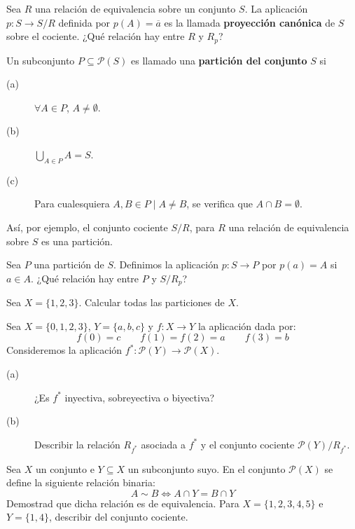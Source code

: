 \begin{ejercicio}
    Sea $R$ una relación de equivalencia sobre un conjunto $S$. La aplicación $p:S\to S/R$ definida por $p(A) = \overline{a}$ es la llamada \textbf{proyección canónica} de $S$ sobre el cociente. ¿Qué relación hay entre $R$ y $R_p$?
\end{ejercicio}

\begin{ejercicio}
    Un subconjunto $P\subseteq \mathcal{P}(S)$ es llamado una \textbf{partición del conjunto} $S$ si
    \begin{description}
        \item [(a)] $\forall A\in P$, $A\neq \emptyset $.
        \item [(b)] $\bigcup_{A\in P}A=S$.
        \item [(c)] Para cualesquiera $A, B\in P \mid A \neq B$, se verifica que $A \cap B = \emptyset $.
    \end{description}
    Así, por ejemplo, el conjunto cociente $S/R$, para $R$ una relación de equivalencia sobre $S$ es una partición.

    Sea $P$ una partición de $S$. Definimos la aplicación $p:S\to P$ por $p(a) = A$ si $a\in A$. ¿Qué relación hay entre $P$ y $S/R_p$?
\end{ejercicio}

\begin{ejercicio}
    Sea $X=\{ 1,2,3 \}$. Calcular todas las particiones de $X$.
\end{ejercicio}

\begin{ejercicio}
    Sea $X=\{ 0,1,2,3 \}$, $Y=\{ a,b,c \}$ y $f:X\to Y$ la aplicación dada por:
    \begin{equation*}
        f(0) = c \qquad f(1) = f(2) = a \qquad f(3) = b
    \end{equation*}
    Consideremos la aplicación $f^*:\mathcal{P}(Y)\to \mathcal{P}(X)$.
    \begin{description}
        \item [(a)] ¿Es $f^*$ inyectiva, sobreyectiva o biyectiva?
        \item [(b)] Describir la relación $R_{f^*}$ asociada a $f^*$ y el conjunto cociente $\mathcal{P}(Y)/R_{f^*}$.
    \end{description}
\end{ejercicio}

\begin{ejercicio}
    Sea $X$ un conjunto e $Y\subseteq X$ un subconjunto suyo. En el conjunto $\mathcal{P}(X)$ se define la siguiente relación binaria:
    \begin{equation*}
        A\sim B \Longleftrightarrow A\cap Y = B \cap Y   
    \end{equation*}
    Demostrad que dicha relación es de equivalencia. Para $X=\{ 1,2,3,4,5 \}$ e $Y=\{ 1,4 \}$, describir del conjunto cociente.
\end{ejercicio}

